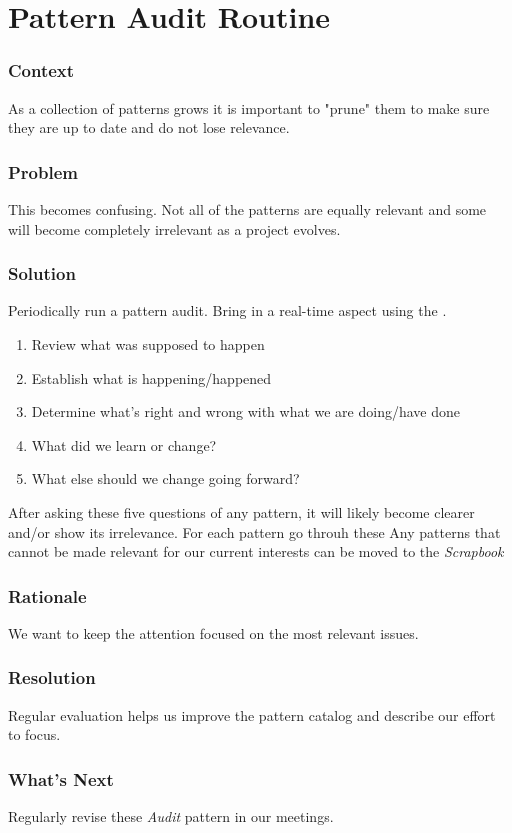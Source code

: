 \section{Pattern Audit Routine}\label{sec:Pattern_Audit_Routine}

\subsubsection*{Context} As a collection of patterns grows it is important to "prune" them to make sure they are up to date and do not lose relevance.

\subsubsection*{Problem} This becomes confusing. Not all of the patterns are equally relevant and some will become completely irrelevant as a project evolves.

\subsubsection*{Solution} Periodically run a pattern audit. Bring in a real-time aspect using the . 

\begin{enumerate}
\item Review what was supposed to happen
\item Establish what is happening/happened
\item Determine what’s right and wrong with what we are doing/have done
\item What did we learn or change?
\item What else should we change going forward?
\end{enumerate}

After asking these five questions of any pattern, it will likely become clearer and/or show its irrelevance. For each pattern go throuh these Any patterns that cannot be made relevant for our current interests can be moved to the \emph{Scrapbook}

\subsubsection*{Rationale} We want to keep the attention focused on the most relevant issues.

\subsubsection*{Resolution} Regular evaluation helps us improve the pattern catalog and describe our effort to focus.

\subsubsection*{What's Next} Regularly revise these \emph{Audit} pattern in our meetings.